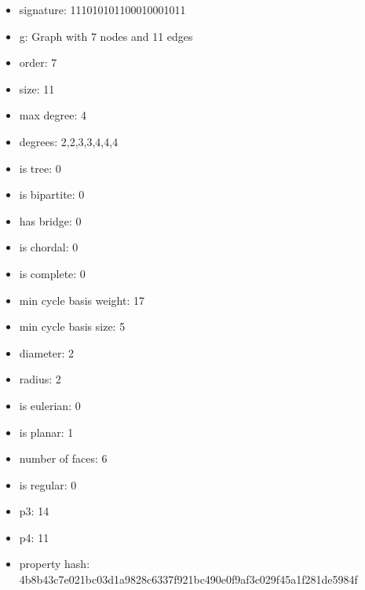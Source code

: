 \begin{itemize}
\item signature: 111010101100010001011
\item g: Graph with 7 nodes and 11 edges
\item order: 7
\item size: 11
\item max degree: 4
\item degrees: 2,2,3,3,4,4,4
\item is tree: 0
\item is bipartite: 0
\item has bridge: 0
\item is chordal: 0
\item is complete: 0
\item min cycle basis weight: 17
\item min cycle basis size: 5
\item diameter: 2
\item radius: 2
\item is eulerian: 0
\item is planar: 1
\item number of faces: 6
\item is regular: 0
\item p3: 14
\item p4: 11
\item property hash: 4b8b43c7e021bc03d1a9828c6337f921bc490e0f9af3c029f45a1f281de5984f
\end{itemize}
\newpage
\begin{figure}
\end{figure}
